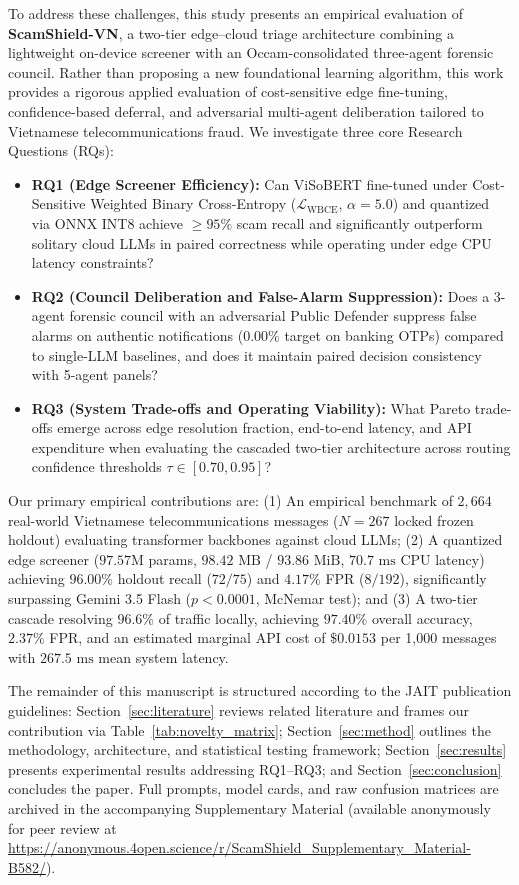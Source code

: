 To address these challenges, this study presents an empirical evaluation of \textbf{ScamShield-VN}, a two-tier edge--cloud triage architecture combining a lightweight on-device screener with an Occam-consolidated three-agent forensic council. Rather than proposing a new foundational learning algorithm, this work provides a rigorous applied evaluation of cost-sensitive edge fine-tuning, confidence-based deferral, and adversarial multi-agent deliberation tailored to Vietnamese telecommunications fraud. We investigate three core Research Questions (RQs):
\begin{itemize}
    \item \textbf{RQ1 (Edge Screener Efficiency):} Can ViSoBERT fine-tuned under Cost-Sensitive Weighted Binary Cross-Entropy ($\mathcal{L}_{\text{WBCE}}$, $\alpha = 5.0$) and quantized via ONNX INT8 achieve $\ge 95\%$ scam recall and significantly outperform solitary cloud LLMs in paired correctness while operating under edge CPU latency constraints?
    \item \textbf{RQ2 (Council Deliberation and False-Alarm Suppression):} Does a 3-agent forensic council with an adversarial Public Defender suppress false alarms on authentic notifications ($0.00\%$ target on banking OTPs) compared to single-LLM baselines, and does it maintain paired decision consistency with 5-agent panels?
    \item \textbf{RQ3 (System Trade-offs and Operating Viability):} What Pareto trade-offs emerge across edge resolution fraction, end-to-end latency, and API expenditure when evaluating the cascaded two-tier architecture across routing confidence thresholds $\tau \in [0.70, 0.95]$?
\end{itemize}

Our primary empirical contributions are: (1) An empirical benchmark of $2,664$ real-world Vietnamese telecommunications messages ($N=267$ locked frozen holdout) evaluating transformer backbones against cloud LLMs; (2) A quantized edge screener ($97.57\text{M}$ params, $98.42\text{ MB}$ / $93.86\text{ MiB}$, $70.7\text{ ms}$ CPU latency) achieving $96.00\%$ holdout recall ($72/75$) and $4.17\%$ FPR ($8/192$), significantly surpassing Gemini 3.5 Flash ($p < 0.0001$, McNemar test); and (3) A two-tier cascade resolving $96.6\%$ of traffic locally, achieving $97.40\%$ overall accuracy, $2.37\%$ FPR, and an estimated marginal API cost of $\$0.0153$ per 1,000 messages with $267.5\text{ ms}$ mean system latency.

The remainder of this manuscript is structured according to the JAIT publication guidelines: Section~\ref{sec:literature} reviews related literature and frames our contribution via Table~\ref{tab:novelty_matrix}; Section~\ref{sec:method} outlines the methodology, architecture, and statistical testing framework; Section~\ref{sec:results} presents experimental results addressing RQ1--RQ3; and Section~\ref{sec:conclusion} concludes the paper. Full prompts, model cards, and raw confusion matrices are archived in the accompanying Supplementary Material (available anonymously for peer review at \url{https://anonymous.4open.science/r/ScamShield_Supplementary_Material-B582/}).